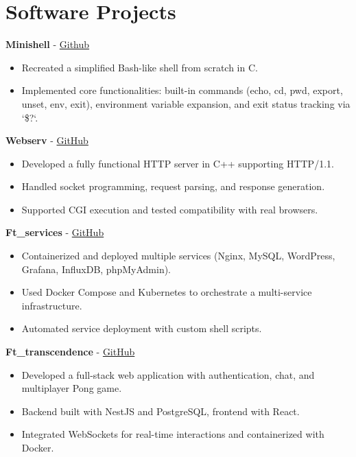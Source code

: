 \documentclass[a4paper,11pt]{article}%
\begin{document}
\section*{Software Projects}%
%
\noindent \textbf{Minishell} - \href{https://github.com/sboof911/minishell}{Github}%
\begin{itemize}[leftmargin=2em,label={},parsep=0pt,topsep=1em]%
\item Recreated a simplified Bash-like shell from scratch in C.%
\item Implemented core functionalities: built-in commands (echo, cd, pwd, export, unset, env, exit), environment variable expansion, and exit status tracking via `\$?`.%
\end{itemize}%
%
\noindent \textbf{Webserv} - \href{https://github.com/sboof911/webserv}{GitHub}%
\begin{itemize}[leftmargin=2em,label={},parsep=0pt,topsep=1em]%
\item Developed a fully functional HTTP server in C++ supporting HTTP/1.1.%
\item Handled socket programming, request parsing, and response generation.%
\item Supported CGI execution and tested compatibility with real browsers.%
\end{itemize}%
%
\noindent \textbf{Ft\_services} - \href{https://github.com/sboof911/ft_services}{GitHub}%
\begin{itemize}[leftmargin=2em,label={},parsep=0pt,topsep=1em]%
\item Containerized and deployed multiple services (Nginx, MySQL, WordPress, Grafana, InfluxDB, phpMyAdmin).%
\item Used Docker Compose and Kubernetes to orchestrate a multi-service infrastructure.%
\item Automated service deployment with custom shell scripts.%
\end{itemize}%
%
\noindent \textbf{Ft\_transcendence} - \href{https://github.com/sboof911/ft_transcendence}{GitHub}%
\begin{itemize}[leftmargin=2em,label={},parsep=0pt,topsep=1em]%
\item Developed a full-stack web application with authentication, chat, and multiplayer Pong game.%
\item Backend built with NestJS and PostgreSQL, frontend with React.%
\item Integrated WebSockets for real-time interactions and containerized with Docker.%
\end{itemize}%
\end{document}

